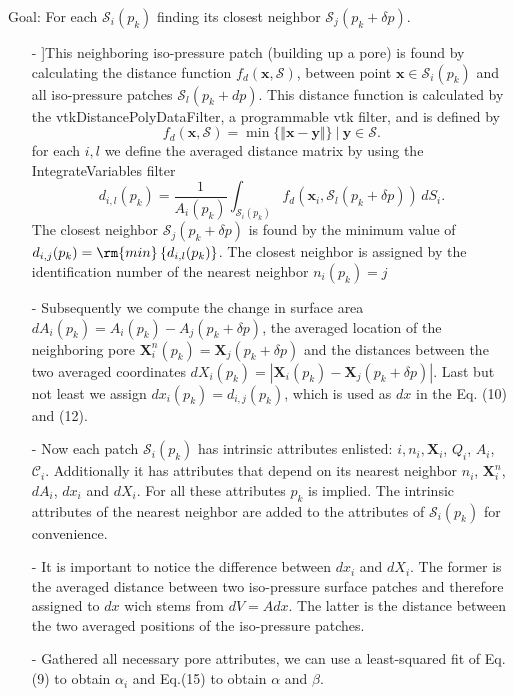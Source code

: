 \documentclass[draft,jgrga]{agutexSI2019}
\begin{document}
\begin{article}
Goal: For each $\mathcal{S}_i(p_k)$ finding its closest neighbor $\mathcal{S}_j(p_k+\delta p)$.  
\begin{itemize}
	\item[-]]This neighboring iso-pressure patch (building up a pore) is found by calculating the distance function $f_d(\mathbf{x},\mathcal{S})$, between point $\mathbf{x}\in \mathcal{S}_i(p_k)$ and all iso-pressure patches $\mathcal{S}_l(p_k+dp)$. This distance function is calculated by the vtkDistancePolyDataFilter, a programmable vtk filter, and is defined by 
		\begin{equation}
			f_d\left(\mathbf{x},\mathcal{S}\right) = \min \{\Vert\mathbf{x}-\mathbf{y}\Vert \} ~|~ \mathbf{y}\in \mathcal{S}.
		\end{equation}
	for each $i,l$ we define the averaged distance matrix by using the IntegrateVariables filter
		\begin{equation}
			d_{i,l}(p_k) = \frac{1}{A_i(p_k)}\int_{\mathcal{S}_i(p_k)} f_d(\mathbf{x}_i,\mathcal{S}_l(p_k+\delta p)) \,dS_i.
		\end{equation}
	The closest neighbor $\mathcal{S}_j(p_k+\delta p)$ is found by the minimum value of $d_{i,j}(p_k) = \rm{min}\left\{ d_{i,l}(p_k)\right\}$. The closest neighbor is assigned by the identification number of the nearest neighbor $n_i(p_k) = j$ 
	\item[-] Subsequently we compute the change in surface area $dA_i(p_k) = A_i(p_k)-A_j(p_k+\delta p)$, the averaged location of the neighboring pore $\mathbf{X}^n_i(p_k) = \mathbf{X}_j(p_k+\delta p)$ and the distances between the two averaged coordinates $dX_i(p_k) = \left| \mathbf{X}_i(p_k)-\mathbf{X}_j(p_k+\delta p)\right|$. Last but not least we assign $dx_i(p_k) = d_{i,j}(p_k)$, which is used as $dx$ in the Eq. (10) and (12).
	\item[-] Now each patch $\mathcal{S}_i(p_k)$ has intrinsic attributes enlisted: $i, n_i, \mathbf{X}_i$, $Q_i$, $A_i$, $\mathcal{C}_i$. Additionally it has attributes that depend on its nearest neighbor $n_i$, $\mathbf{X}^n_i$, $dA_i$, $dx_i$ and $dX_i$. For all these attributes $p_k$ is implied. The intrinsic attributes of the nearest neighbor are added to the attributes of $\mathcal{S}_i(p_k)$ for convenience. 
	\item[-] It is important to notice the difference between $dx_i$ and $dX_i$. The former is the averaged distance between two iso-pressure surface patches and therefore assigned to $dx$ wich stems from $dV = Adx$. The latter is the distance between the two averaged positions of the iso-pressure patches. 
	\item[-]Gathered all necessary pore attributes, we can use a least-squared fit of Eq.(9) to obtain $\alpha_i$ and Eq.(15) to obtain $\alpha$ and $\beta$. 
\end{itemize}



\end{article}
\end{document}
